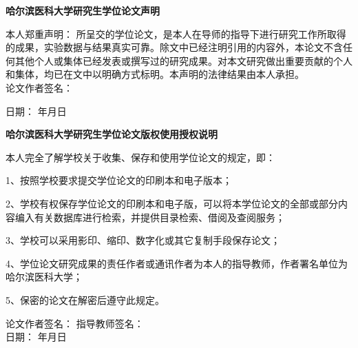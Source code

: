 

\makecover


\linespread{2}%
\clearpage
\thispagestyle{empty}
\begin{center}
	\hei\xiaosan\bfseries 哈尔滨医科大学研究生学位论文声明
\end{center}
\vspace*{0.8cm}
\song\xiaosi

本人郑重声明： 所呈交的学位论文，是本人在导师的指导下进行研究工作所取得的成果，实验数据与结果真实可靠。除文中已经注明引用的内容外，本论文不含任何其他个人或集体已经发表或撰写过的研究成果。对本文研究做出重要贡献的个人和集体，均已在文中以明确方式标明。本声明的法律结果由本人承担。\\

论文作者签名：

\hspace{6cm}	 日期：\hspace{5em} 年\hspace{2em}月\hspace{2em}日\hspace{2em}\\

\begin{center}
	\hei\xiaosan\bfseries 哈尔滨医科大学研究生学位论文版权使用授权说明
\end{center}
\vspace*{0.8cm}
\song\xiaosi

本人完全了解学校关于收集、保存和使用学位论文的规定，即：

1、按照学校要求提交学位论文的印刷本和电子版本；

2、学校有权保存学位论文的印刷本和电子版，可以将本学位论文的全部或部分内容编入有关数据库进行检索，并提供目录检索、借阅及查阅服务；

3、学校可以采用影印、缩印、数字化或其它复制手段保存论文；

4、学位论文研究成果的责任作者或通讯作者为本人的指导教师，作者署名单位为哈尔滨医科大学；

5、保密的论文在解密后遵守此规定。
\vspace*{0.8cm}

论文作者签名：\hspace{4cm} 指导教师签名：\\

\hspace{6cm}	 日期：\hspace{5em} 年\hspace{2em}月\hspace{2em}日\hspace{2em}\\
    \newpage
~\vspace{1em}
\thispagestyle{empty}